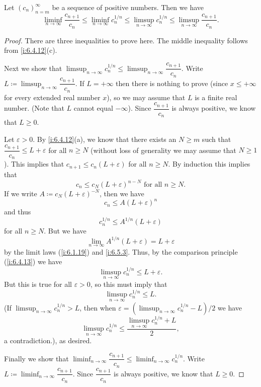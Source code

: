\begin{lem}\label{i:7.5.2}
  Let \((c_n)_{n = m}^\infty\) be a sequence of positive numbers.
  Then we have
  \[
    \liminf_{n \to \infty} \dfrac{c_{n + 1}}{c_n} \leq \liminf_{n \to \infty} c_n^{1 / n} \leq \limsup_{n \to \infty} c_n^{1 / n} \leq \limsup_{n \to \infty} \dfrac{c_{n + 1}}{c_n}.
  \]
\end{lem}

\begin{proof}
  There are three inequalities to prove here.
  The middle inequality follows from \cref{i:6.4.12}(c).

  Next we show that \(\limsup_{n \to \infty} c_n^{1 / n} \leq \limsup_{n \to \infty} \dfrac{c_{n + 1}}{c_n}\).
  Write \(L \coloneqq \limsup_{n \to \infty} \dfrac{c_{n + 1}}{c_n}\).
  If \(L = +\infty\) then there is nothing to prove (since \(x \leq +\infty\) for every extended real number \(x\)), so we may assume that \(L\) is a finite real number.
  (Note that \(L\) cannot equal \(-\infty\)).
  Since \(\dfrac{c_{n + 1}}{c_n}\) is always positive, we know that \(L \geq 0\).

  Let \(\varepsilon > 0\).
  By \cref{i:6.4.12}(a), we know that there exists an \(N \geq m\) such that \(\dfrac{c_{n + 1}}{c_n} \leq L + \varepsilon\) for all \(n \geq N\)
  (without loss of generality we may assume that \(N \geq 1\)).
  This implies that \(c_{n + 1} \leq c_n (L + \varepsilon)\) for all \(n \geq N\).
  By induction this implies that
  \[
    c_n \leq c_N (L + \varepsilon)^{n - N} \text{ for all } n \geq N.
  \]
  If we write \(A \coloneqq c_N (L + \varepsilon)^{-N}\), then we have
  \[
    c_n \leq A(L + \varepsilon)^n
  \]
  and thus
  \[
    c_n^{1 / n} \leq A^{1 / n} (L + \varepsilon)
  \]
  for all \(n \geq N\).
  But we have
  \[
    \lim_{n \to \infty} A^{1 / n} (L + \varepsilon) = L + \varepsilon
  \]
  by the limit laws (\cref{i:6.1.19}) and \cref{i:6.5.3}.
  Thus, by the comparison principle (\cref{i:6.4.13}) we have
  \[
    \limsup_{n \to \infty} c_n^{1 / n} \leq L + \varepsilon.
  \]
  But this is true for all \(\varepsilon > 0\), so this must imply that
  \[
    \limsup_{n \to \infty} c_n^{1 / n} \leq L.
  \]
  (If \(\limsup_{n \to \infty} c_n^{1 / n} > L\), then when \(\varepsilon = (\limsup_{n \to \infty} c_n^{1 / n} - L) / 2\) we have
  \[
    \limsup_{n \to \infty} c_n^{1 / n} \leq \dfrac{\limsup_{n \to \infty} c_n^{1 / n} + L}{2},
  \]
  a contradiction.), as desired.

  Finally we show that \(\liminf_{n \to \infty} \dfrac{c_{n + 1}}{c_n} \leq \liminf_{n \to \infty} c_n^{1 / n}\).
  Write \(L \coloneqq \liminf_{n \to \infty} \dfrac{c_{n + 1}}{c_n}\).
  Since \(\dfrac{c_{n + 1}}{c_n}\) is always positive, we know that \(L \geq 0\).


\end{proof}
